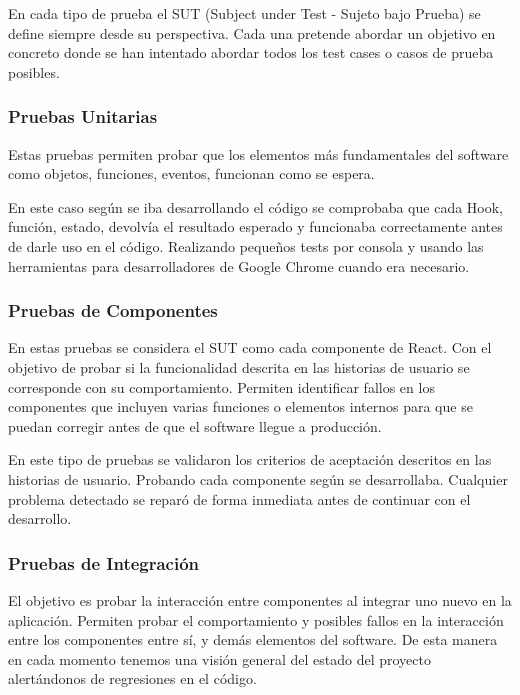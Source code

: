 \documentclass[12pt,twoside,titlepage]{report}
\begin{document}
En cada tipo de prueba el SUT (Subject under Test - Sujeto bajo Prueba) se define siempre desde su perspectiva. Cada una pretende abordar un objetivo en concreto donde se han intentado abordar todos los test cases o casos de prueba posibles.

\subsubsection{Pruebas Unitarias}

Estas pruebas permiten probar que los elementos más fundamentales del software como objetos, funciones, eventos, funcionan como se espera. 

En este caso según se iba desarrollando el código se comprobaba que cada Hook, función, estado, devolvía el resultado esperado y funcionaba correctamente antes de darle uso en el código. 
Realizando pequeños tests por consola y usando las herramientas para desarrolladores de Google Chrome cuando era necesario.

\subsubsection{Pruebas de Componentes}

En estas pruebas se considera el SUT como cada componente de React. Con el objetivo de probar si la funcionalidad descrita en las historias de usuario se corresponde con su comportamiento.
Permiten identificar fallos en los componentes que incluyen varias funciones o elementos internos para que se puedan corregir antes de que el software llegue a producción. 

En este tipo de pruebas se validaron los criterios de aceptación descritos en las historias de usuario. Probando cada componente según se desarrollaba. Cualquier problema detectado se reparó de forma inmediata antes de continuar con el desarrollo.

\subsubsection{Pruebas de Integración}

El objetivo es probar la interacción entre componentes al integrar uno nuevo en la aplicación. Permiten probar el comportamiento y posibles fallos en la interacción entre los componentes entre sí, y demás elementos del software.
De esta manera en cada momento tenemos una visión general del estado del proyecto alertándonos de regresiones en el código.
\end{document}
